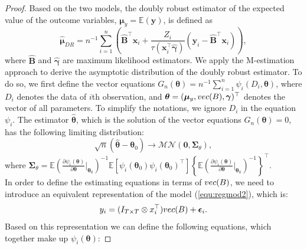 \documentclass[10pt,a4paper]{amsart}
\newcommand{\IdenMat}{\textbf{I}}
\newcommand{\LogCoe}{\boldsymbol{\gamma}}
\newcommand{\ObsCov}{\textbf{x}_i}
\newcommand{\ObsRes}{\textbf{y}_i}
\newcommand{\SumOverN}{\sum_{i=1}^n}
\newcommand{\vect}{\emph{vec}}
\begin{document}
    \begin{proof}       
        Based on the two models, the doubly robust estimator of the expected value of the outcome variables, $\boldsymbol{\mu}_{y} = \mathbb{E}(\textbf{y})$, is defined as
            \begin{equation*}
                \hat{\boldsymbol{\mu}}_{DR} = n^{-1} \SumOverN \left( \hat{\textbf{B}}^{\top}\ObsCov + \frac{Z_i}{\tau(\ObsCov^{\top}\hat{\LogCoe})}(\ObsRes -\hat{\textbf{B}}^{\top}\ObsCov)  \right),
            \end{equation*}
        where $\hat{\textbf{B}}$ and $\hat{\LogCoe}$ are maximum likelihood estimators.
        We apply the M-estimation approach to derive the asymptotic distribution of the doubly robust estimator.
        To do so, we first define the vector equations $G_n(\boldsymbol{\theta}) = n^{-1}\SumOverN{\psi_i(D_i, \boldsymbol{\theta})}$, where $D_i$ denotes the data of $i$th observation, and $\boldsymbol{\theta} = (\boldsymbol{\mu}_y, \vect(\textbf{B}), \LogCoe)^{\top}$ denotes the vector of all parameters. 
        To simplify the notations, we ignore $D_i$ in the equation $\psi_i$.
        The estimator $\hat{\boldsymbol{\theta}}$, which is the solution of the vector equations $G_n(\boldsymbol{\theta}) = 0$, has the following limiting distribution: 
            \begin{equation*}
                \sqrt{n}(\hat{\boldsymbol{\theta}} - \boldsymbol{\theta}_0) \to \mathcal{MN}(\textbf{0}, \boldsymbol{\Sigma}_{\theta}),
            \end{equation*}
        where $\boldsymbol{\Sigma}_{\theta} = \mathbb{E} \left( \frac{\partial \psi_i(\boldsymbol{\theta})}{ \partial \boldsymbol{\theta}} \biggr\rvert_{\boldsymbol{\theta}_0} \right)^{-1} 
                    \mathbb{E} [ \psi_i(\boldsymbol{\theta}_0)\psi_i(\boldsymbol{\theta}_0)^{\top} ]
                    \left\{ \mathbb{E} \left( \frac{\partial \psi_i(\boldsymbol{\theta})}{ \partial \boldsymbol{\theta}} \biggr\rvert_{\boldsymbol{\theta}_0} \right)^{-1} \right\}^{\top}$. \\                
        In order to define the estimating equations in terms of $\vect(\textbf{B})$, we need to introduce an equivalent representation of the model (\ref{equ:regmod2}), which is:
            \begin{equation*}
                \ObsRes = (\IdenMat_{T \times T} \otimes \ObsCov^{\top})\vect(\textbf{B}) + \boldsymbol{\epsilon}_i.
            \end{equation*}
        Based on this representation we can define the following equations, which together make up $\psi_i(\boldsymbol{\theta})$:

\end{proof}
\end{document}
